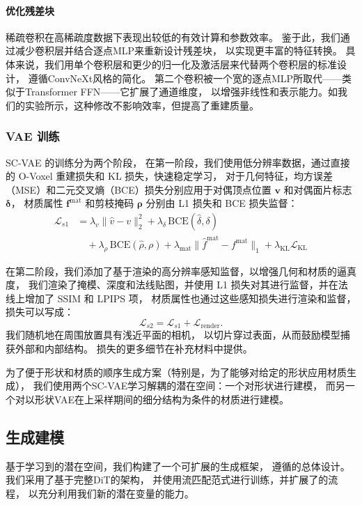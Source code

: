 \paragraph{优化残差块}
稀疏卷积在高稀疏度数据下表现出较低的有效计算和参数效率。
鉴于此，我们通过减少卷积层并结合逐点MLP来重新设计残差块，
以实现更丰富的特征转换。
具体来说，我们用单个卷积层和更少的归一化及激活层来代替两个卷积层的标准设计，
遵循ConvNeXt风格的简化。
第二个卷积被一个宽的逐点MLP所取代——类似于Transformer FFN——它扩展了通道维度，
以增强非线性和表示能力。如我们的实验所示，这种修改不影响效率，但提高了重建质量。

\subsubsection{VAE 训练} \label{sec:render_loss}
SC-VAE 的训练分为两个阶段，  
在第一阶段，我们使用低分辨率数据，通过直接的 O-Voxel 重建损失和 KL 损失，快速稳定学习，  
对于几何特征，均方误差（MSE）和二元交叉熵（BCE）损失分别应用于对偶顶点位置 $\bm{v}$ 和对偶面片标志 $\bm{\delta}$，  
材质属性 $\bm{f}^{\text{mat}}$ 和剪枝掩码 $\bm{\rho}$ 分别由 L1 损失和 BCE 损失监督：
\begin{equation}
\begin{split}
\mathcal{L}_{s1} &= \lambda_v \|\hat{v} - v\|_2^2 + \lambda_\delta \, \text{BCE}(\hat{\delta}, \delta) \\
&\quad + \lambda_\rho \, \text{BCE}(\hat{\rho}, \rho) + \lambda_{\text{mat}} \|\hat{f}^{\text{mat}} - f^{\text{mat}}\|_1 + \lambda_{\text{KL}} \mathcal{L}_{\text{KL}}
\end{split}
\tag{6}
\end{equation}

在第二阶段，我们添加了基于渲染的高分辨率感知监督，以增强几何和材质的逼真度，  
我们渲染了掩模、深度和法线贴图，并使用 L1 损失对其进行监督，并在法线上增加了 SSIM 和 LPIPS 项，  
材质属性也通过这些感知损失进行渲染和监督，  
损失可以写成：
\begin{equation}
\mathcal{L}_{s2} = \mathcal{L}_{s1} + \mathcal{L}_{\text{render}}.
\tag{6}
\end{equation}
我们随机地在周围放置具有浅近平面的相机，
以切片穿过表面，从而鼓励模型捕获外部和内部结构。
损失的更多细节在补充材料中提供。

为了便于形状和材质的顺序生成方案（特别是，为了能够对给定的形状应用材质生成），
我们使用两个SC-VAE学习解耦的潜在空间：一个对形状进行建模，
而另一个对以形状VAE在上采样期间的细分结构为条件的材质进行建模。

\subsection{生成建模}
基于学习到的潜在空间，我们构建了一个可扩展的生成框架，
遵循的总体设计。我们采用了基于完整DiT的架构，
并使用流匹配范式进行训练，并扩展了的流程，
以充分利用我们新的潜在变量的能力。

